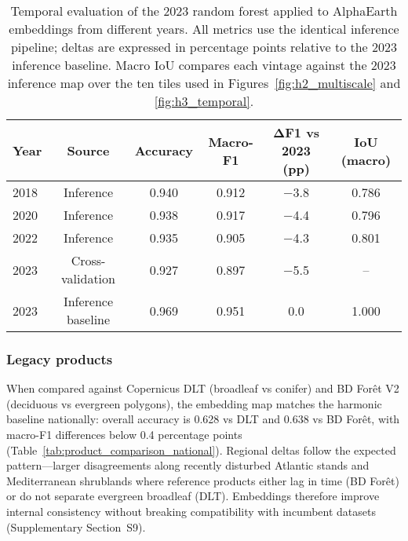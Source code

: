 \documentclass[utf8]{FrontiersinHarvard}
\begin{document}
\begin{table}[H]
    \centering
    \small
    \begin{tabular}{lccccc}
        \toprule
        \textbf{Year} & \textbf{Source} & \textbf{Accuracy} & \textbf{Macro-F1} & \textbf{ΔF1 vs 2023 (pp)} & \textbf{IoU (macro)} \\
        \midrule
        2018 & Inference & 0.940 & 0.912 & −3.8 & 0.786 \\
        2020 & Inference & 0.938 & 0.917 & −4.4 & 0.796 \\
        2022 & Inference & 0.935 & 0.905 & −4.3 & 0.801 \\
        2023 & Cross-validation & 0.927 & 0.897 & −5.5 & -- \\
        2023 & Inference baseline & 0.969 & 0.951 & 0.0 & 1.000 \\
        \bottomrule
    \end{tabular}
    \caption{Temporal evaluation of the 2023 random forest applied to AlphaEarth embeddings from different years. All metrics use the identical inference pipeline; deltas are expressed in percentage points relative to the 2023 inference baseline. Macro IoU compares each vintage against the 2023 inference map over the ten tiles used in Figures~\ref{fig:h2_multiscale} and \ref{fig:h3_temporal}.}
    \label{tab:temporal_stability}
\end{table}

\subsubsection{Legacy products}

When compared against Copernicus DLT (broadleaf vs conifer) and BD Forêt V2 (deciduous vs evergreen polygons), the embedding map matches the harmonic baseline nationally: overall accuracy is 0.628 vs DLT and 0.638 vs BD Forêt, with macro-F1 differences below 0.4 percentage points (Table~\ref{tab:product_comparison_national}). Regional deltas follow the expected pattern—larger disagreements along recently disturbed Atlantic stands and Mediterranean shrublands where reference products either lag in time (BD Forêt) or do not separate evergreen broadleaf (DLT). Embeddings therefore improve internal consistency without breaking compatibility with incumbent datasets (Supplementary Section~S9).
\end{document}
